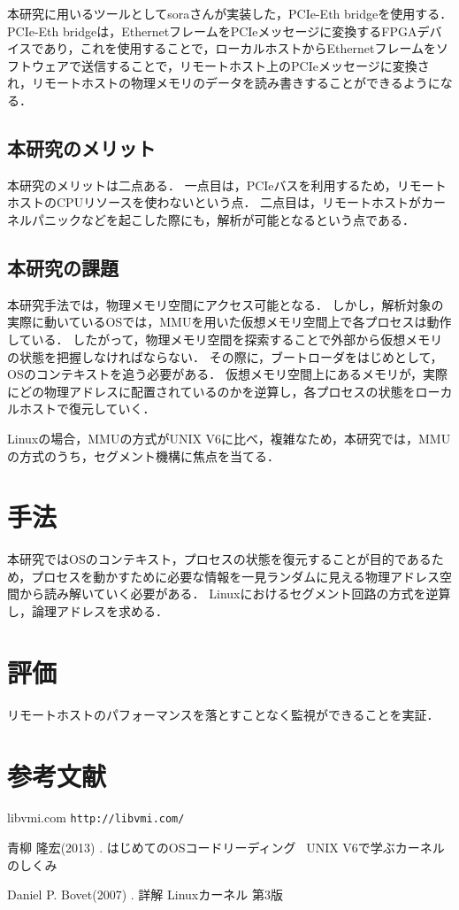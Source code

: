 \documentclass[a4j,10pt]{jsarticle}
\begin{document}
    本研究に用いるツールとしてsoraさんが実装した，PCIe-Eth bridgeを使用する．PCIe-Eth bridgeは，EthernetフレームをPCIeメッセージに変換するFPGAデバイスであり，これを使用することで，ローカルホストからEthernetフレームをソフトウェアで送信することで，リモートホスト上のPCIeメッセージに変換され，リモートホストの物理メモリのデータを読み書きすることができるようになる．

    \subsection{本研究のメリット}

    本研究のメリットは二点ある．
    一点目は，PCIeバスを利用するため，リモートホストのCPUリソースを使わないという点．
    二点目は，リモートホストがカーネルパニックなどを起こした際にも，解析が可能となるという点である．

    \subsection{本研究の課題}

    本研究手法では，物理メモリ空間にアクセス可能となる．
    しかし，解析対象の実際に動いているOSでは，MMUを用いた仮想メモリ空間上で各プロセスは動作している．
    したがって，物理メモリ空間を探索することで外部から仮想メモリの状態を把握しなければならない．
    その際に，ブートローダをはじめとして，OSのコンテキストを追う必要がある．
    仮想メモリ空間上にあるメモリが，実際にどの物理アドレスに配置されているのかを逆算し，各プロセスの状態をローカルホストで復元していく．\cite{unixv6}

    Linuxの場合，MMUの方式がUNIX V6に比べ，複雑なため，本研究では，MMUの方式のうち，セグメント機構に焦点を当てる．

    \section{手法}

    本研究ではOSのコンテキスト，プロセスの状態を復元することが目的であるため，プロセスを動かすために必要な情報を一見ランダムに見える物理アドレス空間から読み解いていく必要がある．
    Linuxにおけるセグメント回路の方式を逆算し，論理アドレスを求める．

    \section{評価}

    リモートホストのパフォーマンスを落とすことなく監視ができることを実証．\cite{linuxkernel}

    \section{参考文献}

    \begin{thebibliography}{99}
		libvmi.com
        \texttt{http://libvmi.com/}

        青柳 隆宏(2013) . はじめてのOSコードリーディング ~UNIX V6で学ぶカーネルのしくみ

        Daniel P. Bovet(2007) . 詳解 Linuxカーネル 第3版
    \end{thebibliography}
\end{document}
